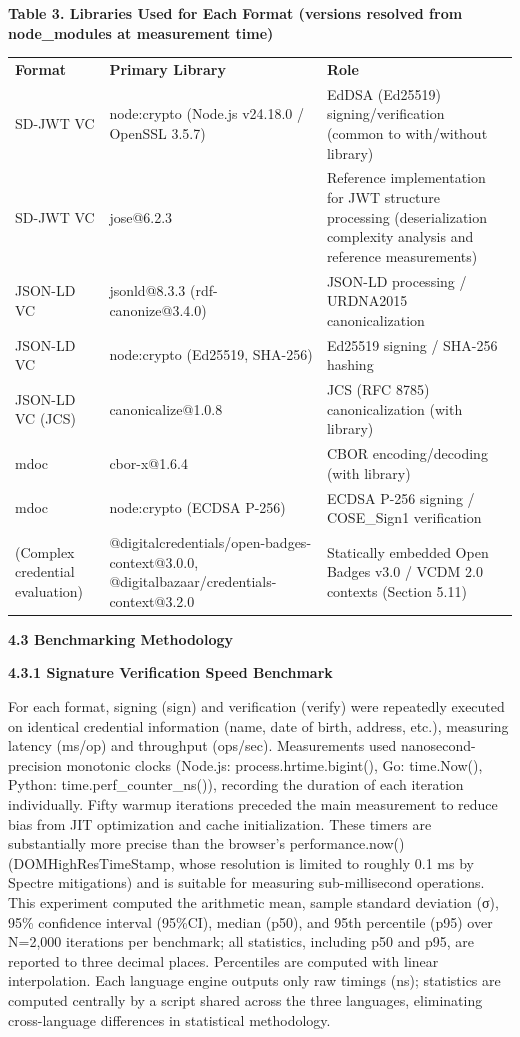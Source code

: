 \textbf{Table 3. Libraries Used for Each Format (versions resolved from node\_modules at measurement time)}

\begin{longtable}[]{@{}lll@{}}
\toprule
\endhead
\textbf{Format} & \textbf{Primary Library} & \textbf{Role}\tabularnewline
SD-JWT VC & node:crypto (Node.js v24.18.0 / OpenSSL 3.5.7) & EdDSA (Ed25519) signing/verification (common to with/without library)\tabularnewline
SD-JWT VC & jose@6.2.3 & Reference implementation for JWT structure processing (deserialization complexity analysis and reference measurements)\tabularnewline
JSON-LD VC & jsonld@8.3.3 (rdf-canonize@3.4.0) & JSON-LD processing / URDNA2015 canonicalization\tabularnewline
JSON-LD VC & node:crypto (Ed25519, SHA-256) & Ed25519 signing / SHA-256 hashing\tabularnewline
JSON-LD VC (JCS) & canonicalize@1.0.8 & JCS (RFC 8785) canonicalization (with library)\tabularnewline
mdoc & cbor-x@1.6.4 & CBOR encoding/decoding (with library)\tabularnewline
mdoc & node:crypto (ECDSA P-256) & ECDSA P-256 signing / COSE\_Sign1 verification\tabularnewline
(Complex credential evaluation) & @digitalcredentials/open-badges-context@3.0.0, @digitalbazaar/credentials-context@3.2.0 & Statically embedded Open Badges v3.0 / VCDM 2.0 contexts (Section 5.11)\tabularnewline
\bottomrule
\end{longtable}

\textbf{4.3 Benchmarking Methodology}

\textbf{4.3.1 Signature Verification Speed Benchmark}

For each format, signing (sign) and verification (verify) were repeatedly executed on identical credential information (name, date of birth, address, etc.), measuring latency (ms/op) and throughput (ops/sec). Measurements used nanosecond-precision monotonic clocks (Node.js: process.hrtime.bigint(), Go: time.Now(), Python: time.perf\_counter\_ns()), recording the duration of each iteration individually. Fifty warmup iterations preceded the main measurement to reduce bias from JIT optimization and cache initialization. These timers are substantially more precise than the browser's performance.now() (DOMHighResTimeStamp, whose resolution is limited to roughly 0.1 ms by Spectre mitigations) and is suitable for measuring sub-millisecond operations. This experiment computed the arithmetic mean, sample standard deviation (σ), 95\% confidence interval (95\%CI), median (p50), and 95th percentile (p95) over N=2,000 iterations per benchmark; all statistics, including p50 and p95, are reported to three decimal places. Percentiles are computed with linear interpolation. Each language engine outputs only raw timings (ns); statistics are computed centrally by a script shared across the three languages, eliminating cross-language differences in statistical methodology.

